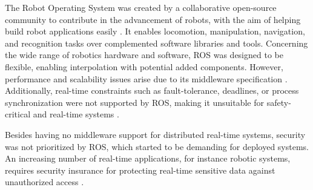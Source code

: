 
The Robot Operating System was created by a collaborative open-source community to contribute in the advancement of robots, with the aim of helping build robot applications easily \cite{diluoffo2018robot}. It enables locomotion, manipulation, navigation, and recognition tasks over complemented software libraries and tools. Concerning the wide range of robotics hardware and software, ROS was designed to be flexible, enabling interpolation with potential added components. However, performance and scalability issues arise due to its middleware specification \cite{intro-ros}. Additionally, real-time constraints such as fault-tolerance, deadlines, or process synchronization were not supported by ROS, making it unsuitable for safety-critical and real-time systems \cite{kim2018security}.

Besides having no middleware support for distributed real-time systems, security was not prioritized by ROS, which started to be demanding for deployed systems. An increasing number of real-time applications, for instance robotic systems, requires security insurance for protecting real-time sensitive data against unauthorized access \cite{lin2009static}.


